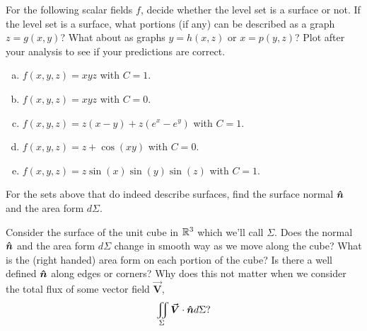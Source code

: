 \documentclass[12pt]{article} %
\newcommand{\vecfieldV}{\boldsymbol{\vec{V}}}
\begin{document}
\begin{problem}
    For the following scalar fields $f$, decide whether the level set is a surface or not. If the level set is a surface, what portions (if any) can be described as a graph $z=g(x,y)$?  What about as graphs $y=h(x,z)$ or $x=p(y,z)$? Plot after your analysis to see if your predictions are correct.
    \begin{enumerate}[(a)]
        \item $f(x,y,z)=xyz$ with $C=1$.
        \item $f(x,y,z)=xyz$ with $C=0$.
        \item $f(x,y,z) = z(x-y)+z(e^x-e^y)$ with $C=1$.
        \item $f(x,y,z) = z + \cos(xy)$ with $C=0$.
        \item $f(x,y,z) = z\sin(x)\sin(y)\sin(z)$ with $C=1$.
    \end{enumerate}
\end{problem}

\begin{problem}
    For the sets above that do indeed describe surfaces, find the surface normal $\boldsymbol{\hat{n}}$ and the area form $d\Sigma$.
\end{problem}

\begin{problem}
    Consider the surface of the unit cube in $\mathbb{R}^3$ which we'll call $\Sigma$.  Does the normal $\boldsymbol{\hat{n}}$ and the area form $d\Sigma$ change in smooth way as we move along the cube?  What is the (right handed) area form on each portion of the cube? Is there a well defined $\boldsymbol{\hat{n}}$ along edges or corners? Why does this not matter when we consider the total flux of some vector field $\vecfieldV$,
    \[
        \iint_\Sigma \vecfieldV \cdot \unitvec d\Sigma?
    \]
\end{problem}
\end{document}
